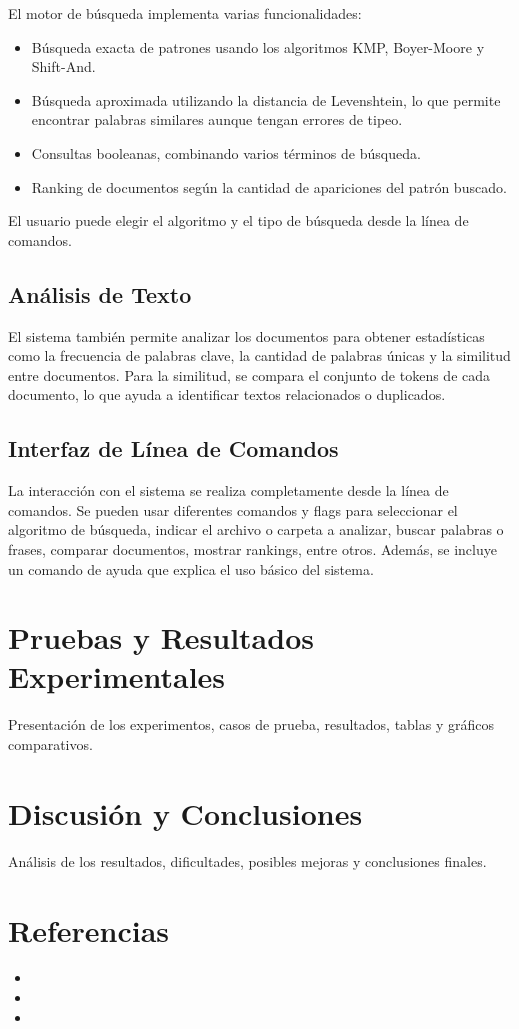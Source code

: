 \documentclass[9pt,letterpaper,onecolumn]{rho-class/rho}
\begin{document}
El motor de búsqueda implementa varias funcionalidades:
\begin{itemize}
    \item Búsqueda exacta de patrones usando los algoritmos KMP, Boyer-Moore y Shift-And.
    \item Búsqueda aproximada utilizando la distancia de Levenshtein, lo que permite encontrar palabras similares aunque tengan errores de tipeo.
    \item Consultas booleanas, combinando varios términos de búsqueda.
    \item Ranking de documentos según la cantidad de apariciones del patrón buscado.
\end{itemize}
El usuario puede elegir el algoritmo y el tipo de búsqueda desde la línea de comandos.

\subsection{Análisis de Texto}

El sistema también permite analizar los documentos para obtener estadísticas como la frecuencia de palabras clave, la cantidad de palabras únicas y la similitud entre documentos. Para la similitud, se compara el conjunto de tokens de cada documento, lo que ayuda a identificar textos relacionados o duplicados.

\subsection{Interfaz de Línea de Comandos}

La interacción con el sistema se realiza completamente desde la línea de comandos. Se pueden usar diferentes comandos y flags para seleccionar el algoritmo de búsqueda, indicar el archivo o carpeta a analizar, buscar palabras o frases, comparar documentos, mostrar rankings, entre otros. Además, se incluye un comando de ayuda que explica el uso básico del sistema.



\section{Pruebas y Resultados Experimentales}
Presentación de los experimentos, casos de prueba, resultados, tablas y gráficos comparativos.

\section{Discusión y Conclusiones}
Análisis de los resultados, dificultades, posibles mejoras y conclusiones finales.

\section{Referencias}
\begin{itemize}
    \item 
    \item 
    \item 
\end{itemize}
\end{document}
